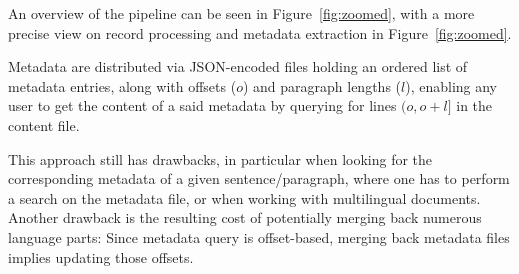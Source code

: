 An overview of the pipeline can be seen in Figure~\ref{fig:zoomed}, with a more precise view on record processing and metadata extraction in Figure~\ref{fig:zoomed}.

Metadata are distributed via JSON-encoded files holding an ordered list of metadata entries, along with offsets ($o$) and paragraph lengths ($l$), enabling any user to get the content of a said metadata by querying for lines $(o, o+l]$ in the content file.

This approach still has drawbacks, in particular when looking for the corresponding metadata of a given sentence/paragraph, where one has to perform a search on the metadata file, or when working with multilingual documents. Another drawback is the resulting cost of potentially merging back numerous language parts: Since metadata query is offset-based, merging back metadata files implies updating those offsets.

